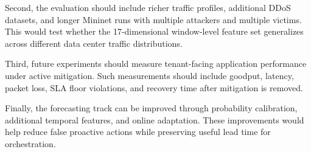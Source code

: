 \documentclass[12pt, a4paper, reqno, oneside]{book}
\begin{document}
Second, the evaluation should include richer traffic profiles, additional DDoS datasets, and longer Mininet runs with multiple attackers and multiple victims. This would test whether the 17-dimensional window-level feature set generalizes across different data center traffic distributions.

Third, future experiments should measure tenant-facing application performance under active mitigation. Such measurements should include goodput, latency, packet loss, SLA floor violations, and recovery time after mitigation is removed.

Finally, the forecasting track can be improved through probability
calibration, additional temporal features, and online adaptation. These improvements would help reduce false proactive actions while preserving useful lead time for orchestration.
\newpage
{}


\end{document}
